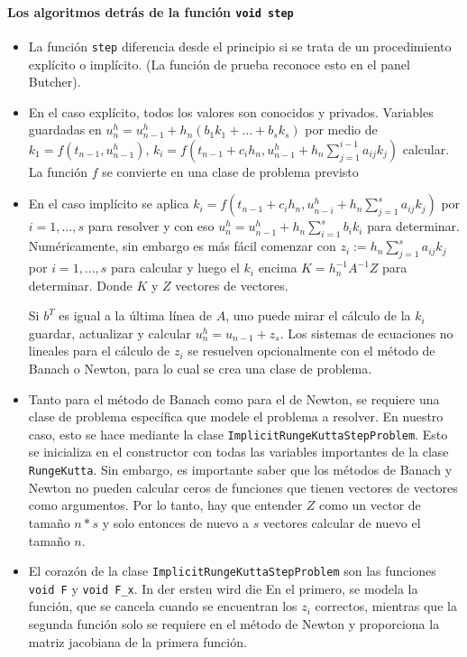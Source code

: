 \paragraph{Los algoritmos detrás de la función \lstinline{void step}}
\begin{itemize}
\item La función \lstinline{step} diferencia desde el principio si se trata de un 
procedimiento explícito o implícito. (La función de prueba reconoce esto en el panel Butcher).
\item En el caso explícito, todos los valores son conocidos y privados.
   Variables guardadas en
  $u_{n}^h = u_{n-1}^h +h_n(b_1k_1+...+b_sk_s)$ por medio de
  $k_1 = f(t_{n-1},u_{n-1}^h)$,
  $k_i = f(t_{n-1}+c_ih_n, u_{n-1}^h+h_n \sum_{j=1}^{i-1}a_{ij}k_j)$
  calcular. La función $ f $ se convierte en una clase de problema previsto
\item En el caso implícito se aplica $k_i = f(t_{n-1}+c_ih_n,
  u_{n-i}^h+h_n \sum_{j=1}^s a_{ij}k_j)$ por $i = 1,...,s$ para resolver y con eso 
 $u_n^h = u_{n-1}^h + h_n \sum_{i = 1}^s b_ik_i $ para determinar. 
 Numéricamente, sin embargo es más fácil comenzar con $z_i := h_n
  \sum_{j=1}^s a_{ij}k_j$ por $i = 1,...,s$ para calcular y luego el
  $k_i$ encima $K= h_n^{-1}A^{-1}Z$ para determinar. Donde $K$ y $Z$
  vectores de vectores.

  Si $b^T$ es igual a la última línea de $A$, uno puede mirar el cálculo de 
  la $k_i$ guardar, actualizar y calcular $u_n^h = u_{n-1}+z_s$. 
  Los sistemas de ecuaciones no lineales para el cálculo de $ z_i $ 
  se resuelven opcionalmente con el método de Banach o Newton, para lo cual se crea una clase de problema.

\item Tanto para el método de Banach como para el de Newton, se requiere una clase de 
  problema específica que modele el problema a resolver. En nuestro caso, esto se hace mediante la clase  \lstinline{ImplicitRungeKuttaStepProblem}. Esto se inicializa en el constructor con todas las variables 
importantes de la clase \lstinline{RungeKutta}. Sin embargo, es importante saber que los métodos de Banach y Newton 
no pueden calcular ceros de funciones que tienen vectores de vectores como argumentos. Por lo tanto, hay que entender $Z$ como un vector de tamaño $n * s$ y solo entonces de nuevo a $s$ vectores
calcular de nuevo el tamaño $n$.

\item El corazón de la clase
  \lstinline{ImplicitRungeKuttaStepProblem} son las funciones
  \lstinline{void F} y \lstinline{void F_x}. In der ersten wird die
  En el primero, se modela la función, que se cancela cuando se encuentran los $ z_i $ correctos, 
  mientras que la segunda función solo se requiere en el método de Newton y proporciona la matriz 
  jacobiana de la primera función.


\end{itemize}
